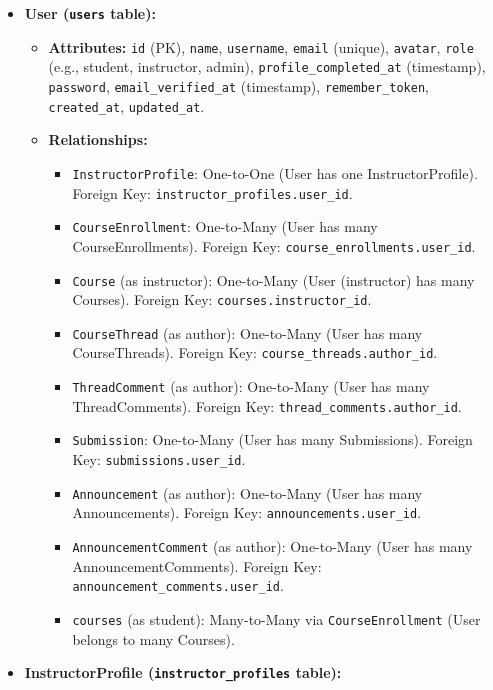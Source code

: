 \documentclass[12pt,a4paper]{article}
\begin{document}
\begin{itemize}
    \item \textbf{User (\texttt{users} table):}
    \begin{itemize}
        \item \textbf{Attributes:} \texttt{id} (PK), \texttt{name}, \texttt{username}, \texttt{email} (unique), \texttt{avatar}, \texttt{role} (e.g., student, instructor, admin), \texttt{profile\_completed\_at} (timestamp), \texttt{password}, \texttt{email\_verified\_at} (timestamp), \texttt{remember\_token}, \texttt{created\_at}, \texttt{updated\_at}.
        \item \textbf{Relationships:}
        \begin{itemize}
            \item \texttt{InstructorProfile}: One-to-One (User has one InstructorProfile). Foreign Key: \texttt{instructor\_profiles.user\_id}.
            \item \texttt{CourseEnrollment}: One-to-Many (User has many CourseEnrollments). Foreign Key: \texttt{course\_enrollments.user\_id}.
            \item \texttt{Course} (as instructor): One-to-Many (User (instructor) has many Courses). Foreign Key: \texttt{courses.instructor\_id}.
            \item \texttt{CourseThread} (as author): One-to-Many (User has many CourseThreads). Foreign Key: \texttt{course\_threads.author\_id}.
            \item \texttt{ThreadComment} (as author): One-to-Many (User has many ThreadComments). Foreign Key: \texttt{thread\_comments.author\_id}.
            \item \texttt{Submission}: One-to-Many (User has many Submissions). Foreign Key: \texttt{submissions.user\_id}.
            \item \texttt{Announcement} (as author): One-to-Many (User has many Announcements). Foreign Key: \texttt{announcements.user\_id}.
            \item \texttt{AnnouncementComment} (as author): One-to-Many (User has many AnnouncementComments). Foreign Key: \texttt{announcement\_comments.user\_id}.
            \item \texttt{courses} (as student): Many-to-Many via \texttt{CourseEnrollment} (User belongs to many Courses).
        \end{itemize}
    \end{itemize}
    \item \textbf{InstructorProfile (\texttt{instructor\_profiles} table):}

\end{itemize}
\end{document}
